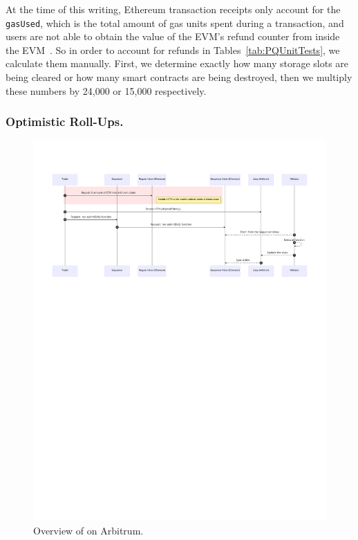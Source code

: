 At the time of this writing, Ethereum transaction receipts only account for the \texttt{gasUsed}, which is the total amount of gas units spent during a transaction, and users are not able to obtain the value of the EVM's refund counter from inside the EVM~\cite{signer2018gas}. So in order to account for refunds in  Tables~\ref{tab:PQUnitTests}, we calculate them manually. First, we determine exactly how many storage slots are being cleared or how many smart contracts are being destroyed, then we multiply these numbers by 24,000 or 15,000 respectively.

\subsubsection{Optimistic Roll-Ups.}
\label{app:rollup}


\begin{figure}
\centering
\includegraphics[width=1\textwidth]{fig/lissyL2.pdf}
\caption{\footnotesize{Overview of \cm on Arbitrum.}  \label{fig:lissyl2}}
\end{figure}



